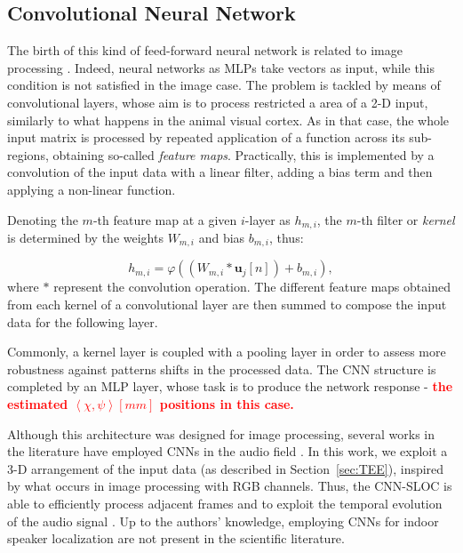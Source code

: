 \documentclass[review]{elsarticle}
\newcommand{\secref}[1]{Section~\ref{#1}}
\begin{document}
\subsection{Convolutional Neural Network}
\label{sec:CNN}
The birth of this kind of feed-forward neural network is related to image processing \cite{lawrence1997face}. Indeed, neural networks as MLPs take vectors as input, while this condition is not satisfied in the image case. The problem is tackled by means of convolutional layers, whose aim is to process restricted a area of a 2-D input, similarly to what happens in the animal visual cortex.
As in that case, the whole input matrix is processed by repeated application of a function across its sub-regions, obtaining so-called \textit{feature maps}. Practically, this is implemented by a convolution of the input data with a linear filter, adding a bias term and then applying a non-linear function.

Denoting the $m$-th feature map at a given $i$-layer as $h_{m,i}$, the $m$-th filter or \textit{kernel} is determined by the weights $W_{m,i}$ and bias $b_{m,i}$, thus:

\begin{equation}
h_{m,i}=\varphi	\left((W_{m,i} \ast \mathbf{u}_j[n]) + b_{m,i} \right),
\end{equation}
where $\ast$ represent the convolution operation.
The different feature maps obtained from each kernel of a convolutional layer are then summed to compose 
the input data for the following layer.

Commonly, a kernel layer is coupled with a pooling layer in order to assess more robustness against patterns shifts in the processed data. The CNN structure is completed by an MLP layer, whose task is to produce the network response - \textcolor{red}{\textbf{the estimated $\left \langle \chi,\psi \right \rangle \left [mm\right ]$ positions in this case.}} %

Although this architecture was designed for image processing, several works in the literature have employed CNNs in the audio field \cite{thomas2014analyzing,mcloughlin2015low}. In this work, we exploit a 3-D arrangement of the input data (as described in \secref{sec:TEE}), %
inspired by what occurs in image processing with RGB channels. Thus, the CNN-SLOC is able to efficiently process adjacent frames and to exploit the temporal evolution of the audio signal \cite{wirn2016-vad}. Up to the authors' knowledge, employing CNNs for indoor speaker localization are not present in the scientific literature.
\end{document}
